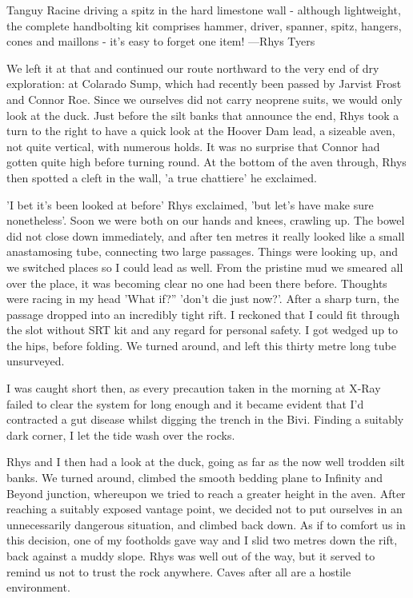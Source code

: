 \begin{marginfigure}
\checkoddpage \ifoddpage \forcerectofloat \else \forceversofloat \fi
\centering
 \caption{Tanguy Racine driving a spitz in the hard limestone wall - although lightweight, the complete handbolting kit comprises hammer, driver, spanner, spitz, hangers, cones and maillons - it's easy to forget one item! ---Rhys Tyers}
 \label{tanguy bolting}
\end{marginfigure}


We left it at that and continued our route northward to the very end of dry exploration: at Colarado Sump, which had recently been passed by Jarvist Frost and Connor Roe. Since we ourselves did not carry neoprene suits, we would only look at the duck. Just before the silt banks that announce the end, Rhys took a turn to the right to have a quick look at the Hoover Dam lead, a sizeable aven, not quite vertical, with numerous holds. It was no surprise that Connor had gotten quite high before turning round. At the bottom of the aven through, Rhys then spotted a cleft in the wall, 'a true chattiere' he exclaimed.

'I bet it's been looked at before' Rhys exclaimed, 'but let's have make sure nonetheless'. Soon we were both on our hands and knees, crawling up. The bowel did not close down immediately, and after ten metres it really looked like a small anastamosing tube, connecting two large passages. Things were looking up, and we switched places so I could lead as well. From the pristine mud we smeared all over the place, it was becoming clear no one had been there before. Thoughts were racing in my head 'What if?'' 'don't die just now?'. After a sharp turn, the passage dropped into an incredibly tight rift. I reckoned that I could fit through the slot without SRT kit and any regard for personal safety. I got wedged up to the hips, before folding. We turned around, and left this thirty metre long tube unsurveyed. 

I was caught short then, as every precaution taken in the morning at X-Ray failed to clear the system for long enough and it became evident that I'd contracted a gut disease whilst digging the trench in the Bivi. Finding a suitably dark corner, I let the tide wash over the rocks. 

Rhys and I then had a look at the duck, going as far as the now well trodden silt banks. We turned around, climbed the smooth bedding plane to Infinity and Beyond junction, whereupon we tried to reach a greater height in the aven. After reaching a suitably exposed vantage point, we decided not to put ourselves in an unnecessarily dangerous situation, and climbed back down. As if to comfort us in this decision, one of my footholds gave way and I slid two metres down the rift, back against a muddy slope. Rhys was well out of the way, but it served to remind us not to trust the rock anywhere. Caves after all are a hostile environment. 

